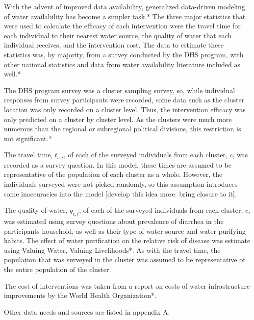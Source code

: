 With the advent of improved data availability, generalized data-driven modeling of water availability has become a simpler task.* The three major statistics that were used to calculate the efficacy of each intervention were the travel time for each individual to their nearest water source, the quality of water that each individual receives, and the intervention cost. The data to estimate these statistics was, by majority, from a survey conducted by the DHS program, with other national statistics and data from water availability literature included as well.*

The DHS program survey was a cluster sampling survey, so, while individual responses from survey participants were recorded, some data such as the cluster location was only recorded on a cluster level. Thus, the intervention efficacy was only predicted on a cluster by cluster level. As the clusters were much more numerous than the regional or subregional political divisions, this restriction is not significant.*

The travel time, $t_{c,i}$, of each of the surveyed individuals from each cluster, $c$, was recorded as a survey question. In this model, these times are assumed to be representative of the population of each cluster as a whole. However, the individuals surveyed were not picked randomly, so this assumption introduces some inaccuracies into the model [develop this idea more. bring closure to it].

The quality of water, $q_{c,i}$, of each of the surveyed individuals from each cluster, $c$, was estimated using survey questions about prevalence of diarrhea in the participants household, as well as their type of water source and water purifying habits. The effect of water purification on the relative risk of disease was estimate using Valuing Water, Valuing Livelihoods*. As with the travel time, the population that was surveyed in the cluster was assumed to be representative of the entire population of the cluster.

The cost of interventions was taken from a report on costs of water infrastructure improvements by the World Health Organization*.

Other data needs and sources are listed in appendix A. 
